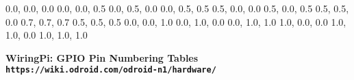 \documentclass[11pt,a4paper]{article}
\begin{document}
\begin{sffamily}
\definecolor{rtb-black}{rgb}  {0.0, 0.0, 0.0}
\definecolor{rtb-navy}{rgb}   {0.0, 0.0, 0.5}
\definecolor{rtb-green}{rgb}  {0.0, 0.5, 0.0}
\definecolor{rtb-teal}{rgb}   {0.0, 0.5, 0.5}
\definecolor{rtb-maroon}{rgb} {0.5, 0.0, 0.0}
\definecolor{rtb-purple}{rgb} {0.5, 0.0, 0.5}
\definecolor{rtb-olive}{rgb}  {0.5, 0.5, 0.0}
\definecolor{rtb-silver}{rgb} {0.7, 0.7, 0.7}
\definecolor{rtb-grey}{rgb}   {0.5, 0.5, 0.5}
\definecolor{rtb-blue}{rgb}   {0.0, 0.0, 1.0}
\definecolor{rtb-lime}{rgb}   {0.0, 1.0, 0.0}
\definecolor{rtb-aqua}{rgb}   {0.0, 1.0, 1.0}
\definecolor{rtb-red}{rgb}    {1.0, 0.0, 0.0}
\definecolor{rtb-yellow}{rgb} {1.0, 1.0, 0.0}
\definecolor{rtb-white}{rgb}  {1.0, 1.0, 1.0}

\begin{center}
\bfseries{WiringPi: GPIO Pin Numbering Tables}\\
\tt{https://wiki.odroid.com/odroid-n1/hardware/}
\end{center}


\end{sffamily}
\end{document}
